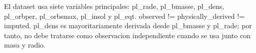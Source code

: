 El dataset usa siete variables principales: pl_rade, pl_bmasse, pl_dens, pl_orbper, pl_orbsmax, pl_insol y pl_eqt. observed != physically_derived != imputed. pl_dens es mayoritariamente derivada desde pl_bmasse y pl_rade; por tanto, no debe tratarse como observacion independiente cuando se usa junto con masa y radio.
